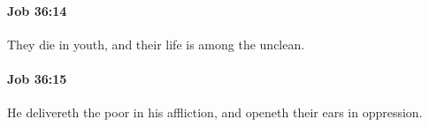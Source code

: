 		\paragraph{Job 36:14} %
			\label{JOB-36-14}

			They die in youth, and their life is among the unclean.


		\paragraph{Job 36:15} %
			\label{JOB-36-15}

			He delivereth the poor in his affliction, and openeth their ears in oppression.


